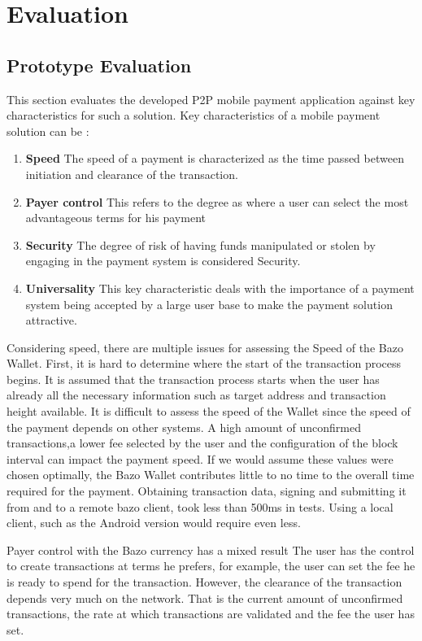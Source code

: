 \chapter{Evaluation}
\section{Prototype Evaluation}
This section evaluates the developed P2P mobile payment application against key characteristics for such a solution. Key characteristics of a mobile payment solution can be :
\begin{enumerate}
\item \textbf{Speed}
The speed of a payment is characterized as the time passed between initiation and clearance of the transaction.
\item \textbf{Payer control}
This refers to the degree as where a user can select the most advantageous terms for his payment
\item \textbf{Security}
The degree of risk of having funds manipulated or stolen by engaging in the payment system is considered Security.
\item \textbf{Universality}
This key characteristic deals with the importance of a payment system being accepted by a large user base to make the payment solution attractive.
\end{enumerate}

Considering speed, there are multiple issues for assessing the Speed of the Bazo Wallet. First, it is hard to determine where the start of the transaction process begins. It is assumed that the transaction process starts when the user has already all the necessary information such as target address and transaction height available. It is difficult to assess the speed of the Wallet since the speed of the payment depends on other systems. A high amount of unconfirmed transactions,a lower fee selected by the user and the configuration of the block interval can impact the payment speed. If we would assume these values were chosen optimally, the Bazo Wallet contributes little to no time to the overall time required for the payment. Obtaining transaction data, signing and submitting it from and to a remote bazo client, took less than 500ms in tests. Using a local client, such as the Android version would require even less.

Payer control with the Bazo currency has a mixed result %
The user has the control to create transactions at terms he prefers, for example, the user can set the fee he is ready to spend for the transaction. However, the clearance of the transaction depends very much on the network. That is the current amount of unconfirmed transactions, the rate at which transactions are validated and the fee the user has set.

